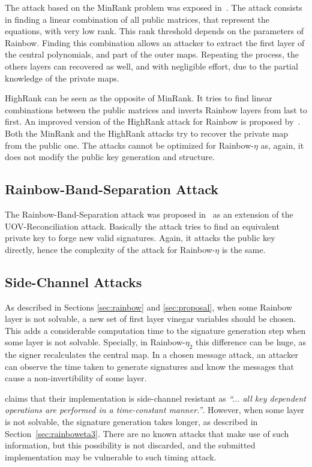 \documentclass{ufsctex/ufsctex}
\begin{document}
The attack based on the MinRank problem was exposed
in~\cite{billet2006cryptanalysis}. The attack consists in finding a linear
combination of all public matrices, that represent the equations, with very low
rank. This rank threshold depends on the parameters of Rainbow. Finding this
combination allows an attacker to extract the first layer of the central
polynomials, and part of the outer maps. Repeating the process, the others
layers can recovered as well, and with negligible effort, due to the partial
knowledge of the private maps.

HighRank can be seen as the opposite of MinRank. It tries to find linear
combinations between the public matrices and inverts Rainbow layers from last
to first. An improved version of the HighRank attack for Rainbow is proposed
by~\cite{ding2008new}. Both the MinRank and the HighRank attacks try to recover
the private map from the public one. The attacks cannot be optimized for
Rainbow-$\eta$ as, again, it does not modify the public key generation and
structure.

\subsection{Rainbow-Band-Separation Attack}

The Rainbow-Band-Separation attack was proposed in~\cite{ding2008new} as an
extension of the UOV-Reconciliation attack. Basically the attack tries to find
an equivalent private key to forge new valid signatures. Again, it attacks the
public key directly, hence the complexity of the attack for Rainbow-$\eta$ is
the same.

\subsection{Side-Channel Attacks}

As described in Sections \ref{sec:rainbow} and \ref{sec:proposal}, when some
Rainbow layer is not solvable, a new set of first layer vinegar variables
should be chosen. This adds a considerable computation time to the signature
generation step when some layer is not solvable. Specially, in Rainbow-$\eta_2$
this difference can be huge, as the signer recalculates the central map. In a
chosen message attack, an attacker can observe the time taken to generate
signatures and know the messages that cause a non-invertibility of some layer.

\cite{ding2017nist} claims that their implementation is side-channel resistant
as \textit{``... all key dependent operations are performed in a time-constant
manner.''}. However, when some layer is not solvable, the signature generation
takes longer, as described in Section~\ref{sec:rainboweta3}. There are no known
attacks that make use of such information, but this possibility is not
discarded, and the submitted implementation may be vulnerable to such timing
attack.
\end{document}
